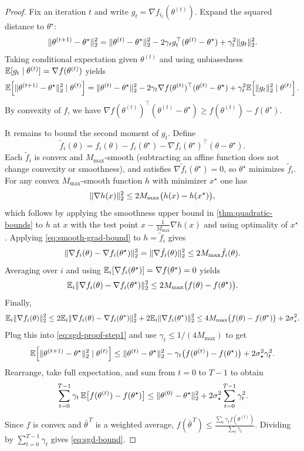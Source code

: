 \begin{proof}
Fix an iteration $t$ and write $g_t=\nabla f_{i_t}(\theta^{(t)})$.
Expand the squared distance to $\theta^\star$:
\[
\lVert\theta^{(t+1)}-\theta^\star\rVert_2^2
= \lVert\theta^{(t)}-\theta^\star\rVert_2^2 - 2\gamma_t g_t^\top(\theta^{(t)}-\theta^\star) + \gamma_t^2\lVert g_t\rVert_2^2.
\]
Taking conditional expectation given $\theta^{(t)}$ and using unbiasedness $\mathbb{E}[g_t\mid \theta^{(t)}]=\nabla f(\theta^{(t)})$ yields
\begin{equation}
  \mathbb{E}\!\left[\lVert\theta^{(t+1)}-\theta^\star\rVert_2^2 \mid \theta^{(t)}\right]
  = \lVert\theta^{(t)}-\theta^\star\rVert_2^2 - 2\gamma_t \nabla f(\theta^{(t)})^\top(\theta^{(t)}-\theta^\star)
  + \gamma_t^2 \mathbb{E}\!\left[\lVert g_t\rVert_2^2 \mid \theta^{(t)}\right].
  \label{eq:sgd-proof-step1}
\end{equation}
By convexity of $f$, we have $\nabla f(\theta^{(t)})^\top(\theta^{(t)}-\theta^\star) \ge f(\theta^{(t)})-f(\theta^\star)$.

It remains to bound the second moment of $g_t$.
Define
\[
\tilde f_i(\theta) = f_i(\theta) - f_i(\theta^\star) - \nabla f_i(\theta^\star)^\top(\theta-\theta^\star).
\]
Each $\tilde f_i$ is convex and $M_{\max}$-smooth (subtracting an affine function does not change convexity or smoothness), and satisfies $\nabla \tilde f_i(\theta^\star)=0$, so $\theta^\star$ minimizes $\tilde f_i$.
For any convex $M_{\max}$-smooth function $h$ with minimizer $x^\star$ one has
\begin{equation}
  \lVert\nabla h(x)\rVert_2^2 \le 2M_{\max}\bigl(h(x)-h(x^\star)\bigr),
  \label{eq:smooth-grad-bound}
\end{equation}
which follows by applying the smoothness upper bound in \cref{thm:quadratic-bounds} to $h$ at $x$ with the test point $x-\frac{1}{M_{\max}}\nabla h(x)$ and using optimality of $x^\star$.
Applying \eqref{eq:smooth-grad-bound} to $h=\tilde f_i$ gives
\[
\lVert\nabla f_i(\theta)-\nabla f_i(\theta^\star)\rVert_2^2
= \lVert\nabla \tilde f_i(\theta)\rVert_2^2
\le 2M_{\max}\tilde f_i(\theta).
\]
Averaging over $i$ and using $\mathbb{E}_i[\nabla f_i(\theta^\star)]=\nabla f(\theta^\star)=0$ yields
\[
\mathbb{E}_i\lVert\nabla f_i(\theta)-\nabla f_i(\theta^\star)\rVert_2^2
\le 2M_{\max}\bigl(f(\theta)-f(\theta^\star)\bigr).
\]
Finally,
\[
\mathbb{E}_i\lVert\nabla f_i(\theta)\rVert_2^2
\le 2\mathbb{E}_i\lVert\nabla f_i(\theta)-\nabla f_i(\theta^\star)\rVert_2^2 + 2\mathbb{E}_i\lVert\nabla f_i(\theta^\star)\rVert_2^2
\le 4M_{\max}\bigl(f(\theta)-f(\theta^\star)\bigr) + 2\sigma_\star^2.
\]
Plug this into \eqref{eq:sgd-proof-step1} and use $\gamma_t \le 1/(4M_{\max})$ to get
\[
\mathbb{E}\!\left[\lVert\theta^{(t+1)}-\theta^\star\rVert_2^2 \mid \theta^{(t)}\right]
\le \lVert\theta^{(t)}-\theta^\star\rVert_2^2
  - \gamma_t\bigl(f(\theta^{(t)})-f(\theta^\star)\bigr)
  + 2\sigma_\star^2\gamma_t^2.
\]
Rearrange, take full expectation, and sum from $t=0$ to $T-1$ to obtain
\[
\sum_{t=0}^{T-1}\gamma_t\,\mathbb{E}\bigl[f(\theta^{(t)})-f(\theta^\star)\bigr]
\le \lVert\theta^{(0)}-\theta^\star\rVert_2^2 + 2\sigma_\star^2\sum_{t=0}^{T-1}\gamma_t^2.
\]
Since $f$ is convex and $\bar\theta^{\,T}$ is a weighted average, $f(\bar\theta^{\,T}) \le \frac{\sum_t \gamma_t f(\theta^{(t)})}{\sum_t \gamma_t}$.
Dividing by $\sum_{t=0}^{T-1}\gamma_t$ gives \eqref{eq:sgd-bound}.
\end{proof}

